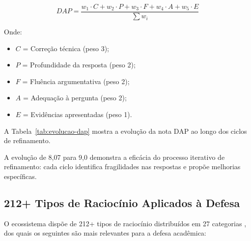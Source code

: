 \begin{equation}
DAP = \frac{w_1 \cdot C + w_2 \cdot P + w_3 \cdot F + w_4 \cdot A + w_5 \cdot E}{\sum w_i}
\end{equation}

Onde:
\begin{itemize}
\item $C$ = Correção técnica (peso 3);
\item $P$ = Profundidade da resposta (peso 2);
\item $F$ = Fluência argumentativa (peso 2);
\item $A$ = Adequação à pergunta (peso 2);
\item $E$ = Evidências apresentadas (peso 1).
\end{itemize}

A Tabela~\ref{tab:evolucao-dap} mostra a evolução da nota DAP ao longo dos
ciclos de refinamento.

\begin{table}[htb]
\centering
    \small
\caption{Evolução da Nota DAP durante o refinamento}
\label{tab:evolucao-dap}
\end{table}

A evolução de 8,07 para 9,0 demonstra a eficácia do processo iterativo de
refinamento: cada ciclo identifica fragilidades nas respostas e propõe
melhorias específicas.

\subsection{212+ Tipos de Raciocínio Aplicados à Defesa}

O ecossistema dispõe de 212+ tipos de raciocínio distribuídos em 27 categorias
\cite{opencode2026ecosystem}, dos quais os seguintes são mais relevantes para
a defesa acadêmica:

